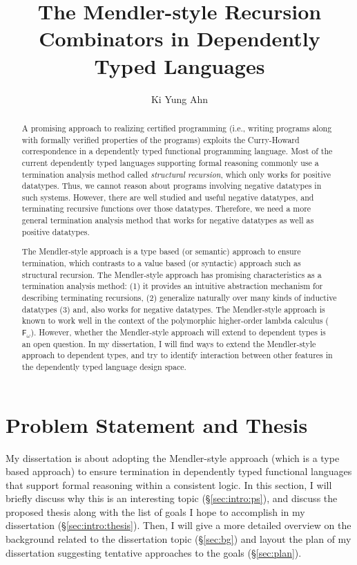 \documentclass[letterpaper,12pt]{article}
\title{The Mendler-style Recursion Combinators in Dependently Typed Languages}
\author{Ki Yung Ahn}
\newcommand{\Fw}[0]{\ensuremath{\mathsf{F}_{\!\omega}}}
\newcommand{\ie}[0]{i.e., }
\begin{document}
\maketitle

\begin{abstract}
A promising approach to realizing certified programming (\ie writing programs
along with formally verified properties of the programs) exploits
the Curry-Howard correspondence in a dependently typed functional programming
language.  Most of the current dependently typed languages supporting
formal reasoning commonly use a termination analysis method called
\emph{structural recursion}, which only works for positive datatypes. Thus,
we cannot reason about programs involving negative datatypes in such systems.
However, there are well studied and useful negative datatypes, and terminating
recursive functions over those datatypes.  Therefore, we need a more general
termination analysis method that works for negative datatypes as well
as positive datatypes.

The Mendler-style approach is a type based (or semantic) approach to
ensure termination, which contrasts to a value based (or syntactic)
approach such as structural recursion.  The Mendler-style approach has
promising characteristics as a termination analysis method:
(1) it provides an intuitive abstraction mechanism
    for describing terminating recursions,
(2) generalize naturally over many kinds of inductive datatypes
(3) and, also works for negative datatypes.
The Mendler-style approach is known to work well in the context of
the polymorphic higher-order lambda calculus (\Fw).  However, whether
the Mendler-style approach will extend to dependent types is an open question.
In my dissertation, I will find ways to extend the Mendler-style approach
to dependent types, and try to identify interaction between other features
in the dependently typed language design space.
\end{abstract}


\section{Problem Statement and Thesis} \label{sec:intro}

My dissertation is about adopting the Mendler-style approach
(which is a type based approach) to ensure termination
in dependently typed functional languages that support
formal reasoning within a consistent logic. 
In this section, I will briefly discuss why this is an interesting topic
(\S\ref{sec:intro:ps}), and discuss the proposed thesis along with
the list of goals I hope to accomplish in my dissertation
(\S\ref{sec:intro:thesis}).
Then, I will give a more detailed overview on the background related to
the dissertation topic (\S\ref{sec:bg}) and layout the plan of my dissertation
suggesting tentative approaches to the goals (\S\ref{sec:plan}).
\end{document}
